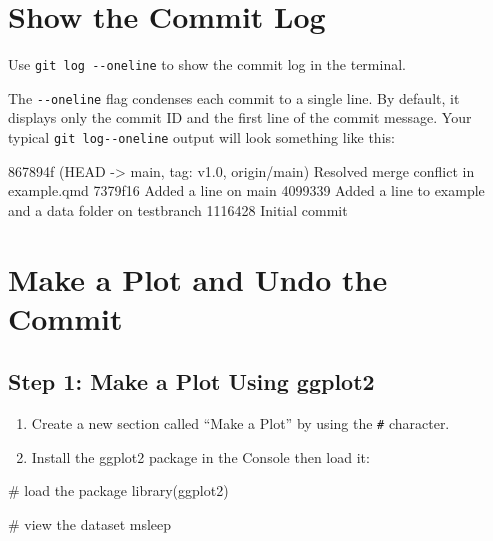 \documentclass[
  11pt,
  letterpaper,
  DIV=11,
  numbers=noendperiod]{scrartcl}
\newenvironment{Shaded}{\begin{snugshade}}{\end{snugshade}}
\newcommand{\CommentTok}[1]{\textcolor[rgb]{0.37,0.37,0.37}{#1}}
\newcommand{\FunctionTok}[1]{\textcolor[rgb]{0.28,0.35,0.67}{#1}}
\newcommand{\NormalTok}[1]{\textcolor[rgb]{0.00,0.23,0.31}{#1}}
\providecommand{\tightlist}{%
  \setlength{\itemsep}{0pt}\setlength{\parskip}{0pt}}\usepackage{longtable,booktabs,array}
\let\textttOrig\texttt
\renewcommand{\texttt}[1]{\textttOrig{\colorbox{codebggray}{\textcolor{codefontcolor}{#1}}}}
\begin{document}
\section{Show the Commit Log}\label{show-the-commit-log}

Use \texttt{git\ log\ -\/-oneline} to show the commit log in the
terminal.

The \texttt{-\/-oneline} flag condenses each commit to a single line. By
default, it displays only the commit ID and the first line of the commit
message. Your typical \texttt{git\ log-\/-oneline} output will look
something like this:

\begin{Shaded}
\begin{Highlighting}[]
\NormalTok{867894f (HEAD {-}\textgreater{} main, tag: v1.0, origin/main) Resolved merge conflict in example.qmd}
\NormalTok{7379f16 Added a line on main}
\NormalTok{4099339 Added a line to example and a data folder on testbranch}
\NormalTok{1116428 Initial commit}
\end{Highlighting}
\end{Shaded}

\newpage

\section{Make a Plot and Undo the
Commit}\label{make-a-plot-and-undo-the-commit}

\subsection{Step 1: Make a Plot Using
ggplot2}\label{step-1-make-a-plot-using-ggplot2}

\begin{enumerate}
\def\labelenumi{\arabic{enumi}.}
\tightlist
\item
  Create a new section called ``Make a Plot'' by using the \texttt{\#}
  character.
\item
  Install the ggplot2 package in the Console then load it:
\end{enumerate}

\begin{Shaded}
\begin{Highlighting}[]
\CommentTok{\# load the package}
\FunctionTok{library}\NormalTok{(ggplot2)}

\CommentTok{\# view the dataset}
\NormalTok{msleep}
\end{Highlighting}
\end{Shaded}
\end{document}
